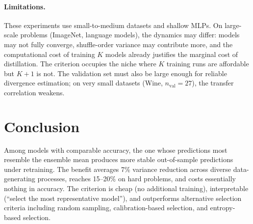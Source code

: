 \documentclass[11pt]{article}
\begin{document}
\paragraph{Limitations.}
These experiments use small-to-medium datasets and shallow MLPs.
On large-scale problems (ImageNet, language models), the dynamics may differ: models may not fully converge, shuffle-order variance may contribute more, and the computational cost of training $K$ models already justifies the marginal cost of distillation.
The criterion occupies the niche where $K$ training runs are affordable but $K{+}1$ is not.
The validation set must also be large enough for reliable divergence estimation; on very small datasets (Wine, $n_\text{val} = 27$), the transfer correlation weakens.


\section{Conclusion}
\label{sec:conclusion}

Among models with comparable accuracy, the one whose predictions most resemble the ensemble mean produces more stable out-of-sample predictions under retraining.
The benefit averages 7\% variance reduction across diverse data-generating processes, reaches 15--20\% on hard problems, and costs essentially nothing in accuracy.
The criterion is cheap (no additional training), interpretable (``select the most representative model''), and outperforms alternative selection criteria including random sampling, calibration-based selection, and entropy-based selection.



\end{document}

